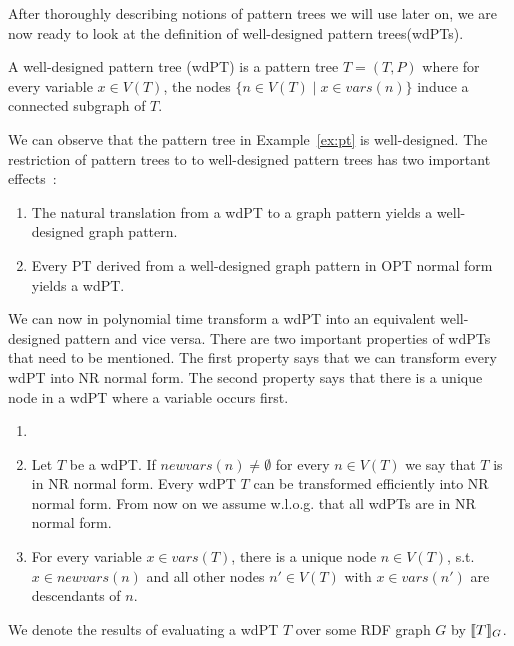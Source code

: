 After thoroughly describing notions of pattern trees we will use later on, we are now ready
to look at the definition of well-designed pattern trees(wdPTs).

\begin{definition}
	A well-designed pattern tree (wdPT) is a pattern tree $T = (T,P)$ where for
	every variable $x \in V(T)$, the nodes $\{n \in V(T) \mid x \in vars(n)\}$
	induce a connected subgraph of $T$.
\end{definition}
We can observe that the pattern tree in Example~\ref{ex:pt} is well-designed.
The restriction of pattern trees to to well-designed pattern trees has two
important effects~\cite{pichler2014containment}: 
\begin{enumerate}
	\item The natural translation from a wdPT to a graph pattern yields a well-designed graph pattern.
	\item Every PT derived from a well-designed graph pattern in OPT normal form
		yields a wdPT. 
\end{enumerate}
We can now in polynomial time transform a wdPT into an equivalent well-designed
pattern and vice versa.
There are two important properties of wdPTs that need to be mentioned. 
The first property says that we can transform every wdPT into NR
normal form. The second property says that there is a unique node in a wdPT where a
variable occurs first.

\begin{proposition}
	\begin{enumerate}	
		\item[]
		\item Let $T$ be a wdPT. If $newvars(n) \neq	\emptyset$ for every $n
			\in V(T)$ we say that $T$ is in NR normal form.  
			Every wdPT $\mathit{T}$ can be transformed efficiently into NR
			normal form. From now on we assume w.l.o.g. that all wdPTs are in NR normal form.

		\item For every variable $x \in vars (T)$, there is a unique node $n \in
			V(T)$, s.t. $x \in newvars(n)$ and all other nodes $n' \in V(T)$
			with $x \in vars(n')$ are descendants of $n$.
	\end{enumerate}
\end{proposition}

We denote the results of evaluating a wdPT $T$ over some RDF graph $G$ by $\llbracket T
\rrbracket_G$. %


